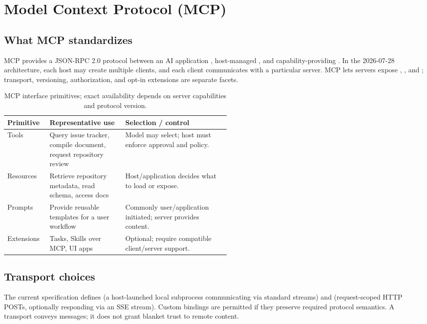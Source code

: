 \documentclass[11pt,letterpaper]{article}
\begin{document}
\section{Model Context Protocol (MCP)}\label{sec:mcp}
\subsection{What MCP standardizes}
MCP provides a JSON-RPC 2.0 protocol between an AI application , host-managed , and capability-providing . In the 2026-07-28 architecture, each host may create multiple clients, and each client communicates with a particular server. MCP lets servers expose , , and ; transport, versioning, authorization, and opt-in extensions are separate facets.\cite{mcp2026,mcparch}

\begin{table}[htbp]\centering\small
\begin{tabularx}{\linewidth}{@{}p{0.19\linewidth}p{0.34\linewidth}X@{}}
\toprule
\textbf{Primitive} & \textbf{Representative use} & \textbf{Selection / control}\\\midrule
Tools & Query issue tracker, compile document, request repository review & Model may select; host must enforce approval and policy.\\
Resources & Retrieve repository metadata, read schema, access docs & Host/application decides what to load or expose.\\
Prompts & Provide reusable templates for a user workflow & Commonly user/application initiated; server provides content.\\
Extensions & Tasks, Skills over MCP, UI apps & Optional; require compatible client/server support.\\\bottomrule
\end{tabularx}
\caption{MCP interface primitives; exact availability depends on server capabilities and protocol version.}
\end{table}

\subsection{Transport choices}
The current specification defines  (a host-launched local subprocess communicating via standard streams) and  (request-scoped HTTP POSTs, optionally responding via an SSE stream). Custom bindings are permitted if they preserve required protocol semantics. A transport conveys messages; it does not grant blanket trust to remote content.\cite{mcptransport}
\end{document}
